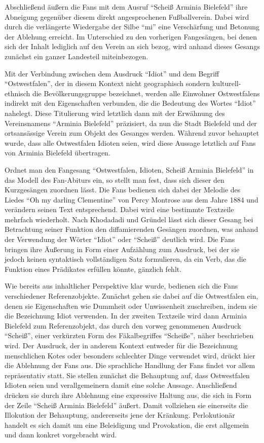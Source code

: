 Abschließend äußern die Fans mit dem Ausruf "`Scheiß Arminia Bielefeld"' ihre Abneigung gegenüber diesem direkt angesprochenen Fußballverein.
Dabei wird durch die verlängerte Wiedergabe der Silbe "`mi"' eine Verschärfung und Betonung der Ablehung erreicht.
Im Unterschied zu den vorherigen Fangesängen, bei denen sich der Inhalt lediglich auf den Verein an sich bezog, wird anhand dieses Gesangs zunächst ein ganzer Landesteil miteinbezogen.

Mit der Verbindung zwischen dem Ausdruck "`Idiot"' und dem Begriff "`Ostwestfalen"', der in diesem Kontext nicht geographisch sondern kulturell-ethnisch die Bevölkerungsgruppe bezeichnet, werden alle Einwohner Ostwestfalens indirekt mit den Eigenschaften verbunden, die die Bedeutung des Wortes "`Idiot"' nahelegt.
Diese Titulierung wird letztlich dann mit der Erwähnung des Vereinsnamens "`Arminia Bielefeld"' präzisiert, da nun die Stadt Bielefeld und der ortsansässige Verein zum Objekt des Gesanges werden.
Während zuvor behauptet wurde, dass alle Ostwestfalen Idioten seien, wird diese Aussage letztlich auf Fans von Arminia Bielefeld übertragen.

Ordnet man den Fangesang "`Ostwestfalen, Idioten, Scheiß Arminia Bielefeld"' in das Modell des Fan-Abiturs ein, so stellt man fest, dass sich dieser den Kurzgesängen zuordnen lässt.
Die Fans bedienen sich dabei der Melodie des Liedes "`Oh my darling Clementine"' von Percy Montrose aus dem Jahre 1884 und verändern seinen Text entsprechend.
Dabei wird eine bestimmte Textzeile mehrfach wiederholt.
Nach Khodadadi und Gründel lässt sich dieser Gesang bei Betrachtung seiner Funktion den diffamierenden Gesängen zuordnen, was anhand der Verwendung der Wörter "`Idiot"' oder "`Scheiß"' deutlich wird.
Die Fans bringen ihre Äußerung in Form einer Aufzählung zum Ausdruck, bei der sie jedoch keinen syntaktisch vollständigen Satz formulieren, da ein Verb, das die Funktion eines Prädikates erfüllen könnte, gänzlich fehlt.

Wie bereits aus inhaltlicher Perspektive klar wurde, bedienen sich die Fans verschiedener Referenzobjekte.
Zunächst gehen sie dabei auf die Ostwestfalen ein, denen sie Eigenschaften wie Dummheit oder Unwissenheit zuschreiben, indem sie die Bezeichnung Idiot verwenden.
In der zweiten Textzeile wird dann Arminia Bielefeld zum Referenzobjekt, das durch den vorweg genommenen Ausdruck "`Scheiß"', einer verkürzten Form des Fäkalbegriffes "`Scheiße"', näher beschrieben wird.
Der Ausdruck, der in anderem Kontext entweder für die Bezeichnung menschlichen Kotes oder besonders schlechter Dinge verwendet wird\cite{Dud14c}, drückt hier die Ablehnung der Fans aus.
Die sprachliche Handlung der Fans findet vor allem repräsentativ statt.
Sie stellen zunächst die Behauptung auf, dass Ostwestfalen Idioten seien und verallgemeinern damit eine solche Aussage.
Anschließend drücken sie durch ihre Ablehnung eine expressive Haltung aus, die sich in Form der Zeile "`Scheiß Arminia Bielefeld"' äußert.
Damit vollziehen sie einerseits die Illokution der Behauptung, andererseits jene der Kränkung.
Perlokutionär handelt es sich damit um eine Beleidigung und Provokation, die erst allgemein und dann konkret vorgebracht wird.

